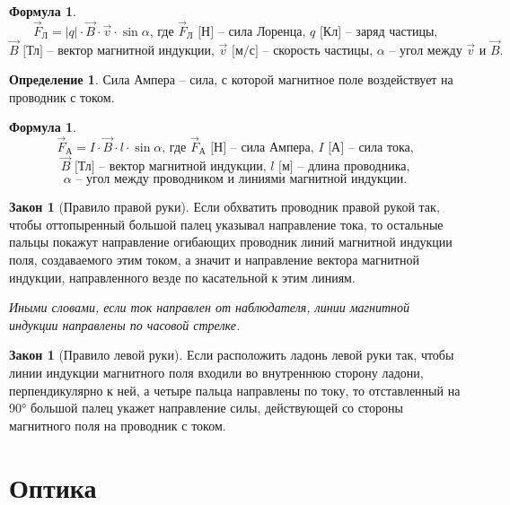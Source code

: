 \documentclass[12pt]{article}
\theoremstyle{definition}
\newtheorem{definition}{Определение}
\newtheorem{law}[theorem]{Закон}
\newtheorem{formula}[theorem]{Формула}
\begin{document}
\begin{formula}
    $$\vec{F}_\text{Л}=|q|\cdot \vec{B}\cdot \vec{v}\cdot \sin \alpha\text{, где }\vec{F}_\text{Л}\text{ [Н] -- сила Лоренца, }q\text{ [Кл] -- заряд частицы,}$$
    $$\vec{B}\text{ [Тл] -- вектор магнитной индукции, }\vec{v}\text{ [м/с] -- скорость частицы, }\alpha\text{ -- угол между }\vec{v}\text{ и }\vec{B}.$$
\end{formula}
\begin{definition}
    Сила Ампера -- сила, с которой магнитное поле воздействует на проводник с током.
\end{definition}
\begin{formula}
    $$\vec{F}_\text{А}=I\cdot \vec{B}\cdot l\cdot \sin \alpha\text{, где }\vec{F}_\text{А}\text{ [Н] -- сила Ампера, }I\text{ [А] -- сила тока,}$$
    $$\vec{B}\text{ [Тл] -- вектор магнитной индукции, }l\text{ [м] -- длина проводника,}$$
    $$\alpha\text{ -- угол между проводником и линиями магнитной индукции.}$$
\end{formula}
\begin{law}[Правило правой руки]
    Если обхватить проводник правой рукой так, чтобы оттопыренный большой палец указывал направление тока, то остальные пальцы покажут направление огибающих проводник линий магнитной индукции поля, создаваемого этим током, а значит и направление вектора магнитной индукции, направленного везде по касательной к этим линиям.\bigskip

    \textit{Иными словами, если ток направлен от наблюдателя, линии магнитной индукции направлены по часовой стрелке.}
\end{law}
\begin{law}[Правило левой руки]
    Если расположить ладонь левой руки так, чтобы линии индукции магнитного поля входили во внутреннюю сторону ладони, перпендикулярно к ней, а четыре пальца направлены по току, то отставленный на 90° большой палец укажет направление силы, действующей со стороны магнитного поля на проводник с током.
\end{law}

\section{Оптика}
\end{document}
